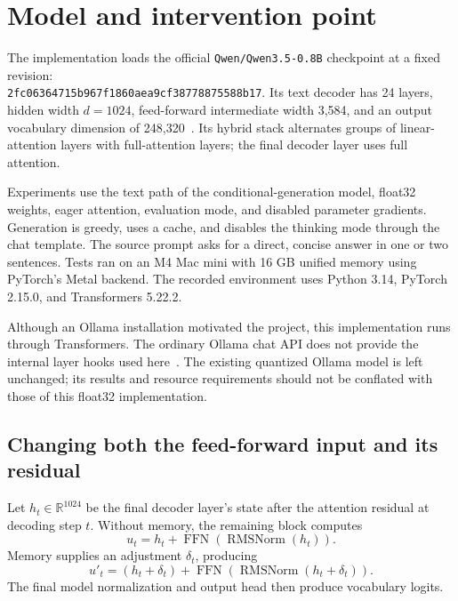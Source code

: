 \documentclass[manuscript,screen,nonacm]{acmart}
\begin{document}
\section{Model and intervention point}
The implementation loads the official \nolinkurl{Qwen/Qwen3.5-0.8B} checkpoint at a fixed revision:\\ {\small\nolinkurl{2fc06364715b967f1860aea9cf38778875588b17}}. Its text decoder has 24 layers, hidden width $d=1024$, feed-forward intermediate width 3,584, and an output vocabulary dimension of 248,320~\cite{qwen}. Its hybrid stack alternates groups of linear-attention layers with full-attention layers; the final decoder layer uses full attention.

Experiments use the text path of the conditional-generation model, float32 weights, eager attention, evaluation mode, and disabled parameter gradients. Generation is greedy, uses a cache, and disables the thinking mode through the chat template. The source prompt asks for a direct, concise answer in one or two sentences. Tests ran on an M4 Mac mini with 16 GB unified memory using PyTorch's Metal backend. The recorded environment uses Python 3.14, PyTorch 2.15.0, and Transformers 5.22.2.

Although an Ollama installation motivated the project, this implementation runs through Transformers. The ordinary Ollama chat API does not provide the internal layer hooks used here~\cite{ollama}. The existing quantized Ollama model is left unchanged; its results and resource requirements should not be conflated with those of this float32 implementation.

\subsection{Changing both the feed-forward input and its residual}
Let $h_t\in\mathbb{R}^{1024}$ be the final decoder layer's state after the attention residual at decoding step $t$. Without memory, the remaining block computes
\begin{equation}
u_t=h_t+\operatorname{FFN}\!\left(\operatorname{RMSNorm}(h_t)\right).
\end{equation}
Memory supplies an adjustment $\delta_t$, producing
\begin{equation}
u'_t=(h_t+\delta_t)+
\operatorname{FFN}\!\left(\operatorname{RMSNorm}(h_t+\delta_t)\right).
\label{eq:intervention}
\end{equation}
The final model normalization and output head then produce vocabulary logits.
\end{document}
